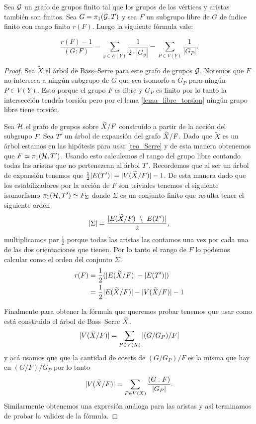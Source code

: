 \documentclass[tesis.tex]{subfiles}
\begin{document}
\begin{prop}\cite{karrass1973finite}\label{prop_karrass_formula}
	Sea $\cal G$ un grafo de grupos finito tal que los grupos de los vértices y aristas también son finitos.
	Sea $G = \pi_1 ({\cal G}, T)$ y sea $F$ un subgrupo libre de $G$ de índice finito con rango finito $r(F)$.
	Luego la siguiente fórmula vale:
	
	\begin{equation*}
		\frac{r(F) - 1}{(G:F)} = \sum_{y \in E(Y)} \frac{1}{2 \cdot |G_y|} - \sum_{P \in V(Y)} \frac{1}{|G_P|}.
	\end{equation*}
\end{prop}
\begin{proof}
	Sea $\tilde X$ el árbol de Bass--Serre para este grafo de grupos ${\cal G}$.
	Notemos que $F$ no interseca a ningún subgrupo de $G$ que sea isomorfo a $G_P$ para ningún $P \in V(Y)$. 
	Esto porque el grupo $F$ es libre y $G_P$ es finito por lo tanto la intersección tendría torsión pero por el lema \ref{lema_libre_torsion} ningún grupo libre tiene torsión.
	
	Sea $\cal H$ el grafo de grupos sobre $\widetilde X/F$ construído a partir de la acción del subgrupo $F$.
	Sea $T'$ un árbol de expansión del grafo $\widetilde X/F$.
	Dado que $\tilde X$ es un árbol estamos en las hipótesis para usar \ref{teo_Serre} y de esta manera obtenemos que $F \simeq \pi_1 ({\cal H}, T')$.
	Usando esto calculemos el rango del grupo libre contando todas las aristas que no pertenezcan al árbol $T'$.
	Recordemos que al ser un árbol de expansión tenemos que $\tfrac{1}{2}|E(T')| = |V(\widetilde X / F)| - 1$. 
	De esta manera dado que los estabilizadores por la acción de $F$ son triviales tenemos el siguiente isomorfismo $\pi_1({\cal H}, T') \simeq F_{\Sigma}$ donde $\Sigma$ es un conjunto finito que resulta tener el siguiente orden 
	\[
		|\Sigma| = \dfrac{|E(\Xm/F) \ \setminus \ E(T')|}{2},
	\]
	multiplicamos por $\tfrac{1}{2}$ porque todas las aristas las contamos una vez por cada una de las dos orientaciones que tienen.
	Por lo tanto el rango de $F$ lo podemos calcular como el orden del conjunto $\Sigma$.
	\begin{align*}
		r(F) &= \frac{1}{2} (|E(\widetilde X / F)| - |E(T')|) \\
		&= \frac{1}{2} |E(\widetilde X / F)| - |V(\widetilde X / F) | - 1
	\end{align*}
	
	Finalmente para obtener la fórmula que queremos probar tenemos que usar como está construido el árbol de Bass--Serre $\widetilde X$.
	\begin{equation*}
		|V(\widetilde X / F)| = \sum_{P \in V(X)} |(G/G_P)/F|
	\end{equation*}
	y acá usamos que que la cantidad de cosets de $(G/G_P)/F$ es la misma que hay en $(G/F)/G_P$
	por lo tanto 
	\begin{equation*}
		|V(\widetilde X / F)| = \sum_{P \in V(X)} \dfrac{(G:F)}{|G_P|}.
	\end{equation*}
	Similarmente obtenemos una expresión análoga para las aristas y así terminamos de probar la validez de la fórmula.
\end{proof}
\end{document}
